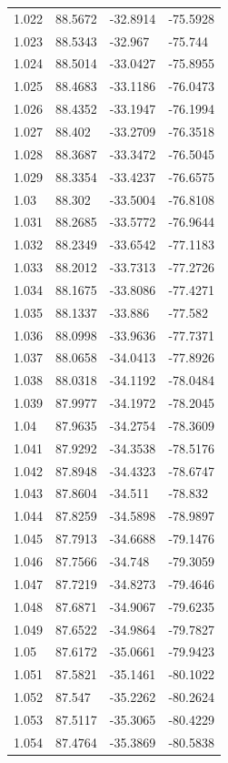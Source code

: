 \begin{tabular}{llll}
1.022 & 88.5672 & -32.8914 & -75.5928 \\
1.023 & 88.5343 & -32.967 & -75.744 \\
1.024 & 88.5014 & -33.0427 & -75.8955 \\
1.025 & 88.4683 & -33.1186 & -76.0473 \\
1.026 & 88.4352 & -33.1947 & -76.1994 \\
1.027 & 88.402 & -33.2709 & -76.3518 \\
1.028 & 88.3687 & -33.3472 & -76.5045 \\
1.029 & 88.3354 & -33.4237 & -76.6575 \\
1.03 & 88.302 & -33.5004 & -76.8108 \\
1.031 & 88.2685 & -33.5772 & -76.9644 \\
1.032 & 88.2349 & -33.6542 & -77.1183 \\
1.033 & 88.2012 & -33.7313 & -77.2726 \\
1.034 & 88.1675 & -33.8086 & -77.4271 \\
1.035 & 88.1337 & -33.886 & -77.582 \\
1.036 & 88.0998 & -33.9636 & -77.7371 \\
1.037 & 88.0658 & -34.0413 & -77.8926 \\
1.038 & 88.0318 & -34.1192 & -78.0484 \\
1.039 & 87.9977 & -34.1972 & -78.2045 \\
1.04 & 87.9635 & -34.2754 & -78.3609 \\
1.041 & 87.9292 & -34.3538 & -78.5176 \\
1.042 & 87.8948 & -34.4323 & -78.6747 \\
1.043 & 87.8604 & -34.511 & -78.832 \\
1.044 & 87.8259 & -34.5898 & -78.9897 \\
1.045 & 87.7913 & -34.6688 & -79.1476 \\
1.046 & 87.7566 & -34.748 & -79.3059 \\
1.047 & 87.7219 & -34.8273 & -79.4646 \\
1.048 & 87.6871 & -34.9067 & -79.6235 \\
1.049 & 87.6522 & -34.9864 & -79.7827 \\
1.05 & 87.6172 & -35.0661 & -79.9423 \\
1.051 & 87.5821 & -35.1461 & -80.1022 \\
1.052 & 87.547 & -35.2262 & -80.2624 \\
1.053 & 87.5117 & -35.3065 & -80.4229 \\
1.054 & 87.4764 & -35.3869 & -80.5838 \\

\end{tabular}
